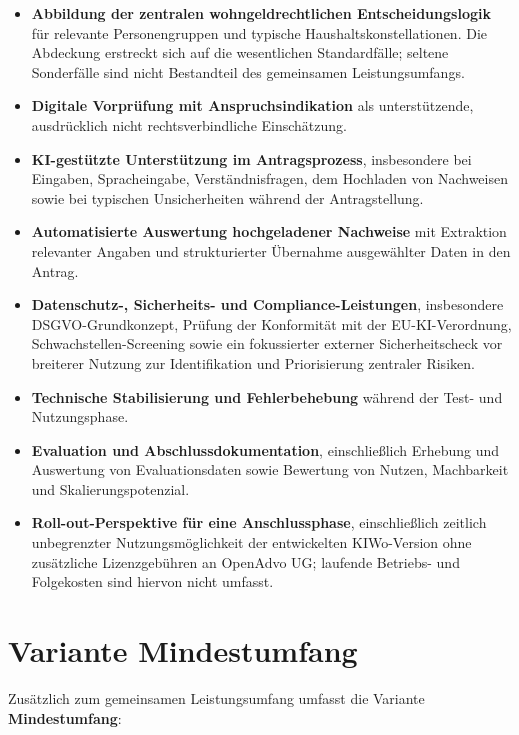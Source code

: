 \documentclass[11pt,a4paper,openany]{report}
\begin{document}
\begin{itemize}
  \item \textbf{Abbildung der zentralen wohngeldrechtlichen Entscheidungslogik} für relevante Personengruppen und typische Haushaltskonstellationen. Die Abdeckung erstreckt sich auf die wesentlichen Standardfälle; seltene Sonderfälle sind nicht Bestandteil des gemeinsamen Leistungsumfangs.
  \item \textbf{Digitale Vorprüfung mit Anspruchsindikation} als unterstützende, ausdrücklich nicht rechtsverbindliche Einschätzung.
  \item \textbf{KI-gestützte Unterstützung im Antragsprozess}, insbesondere bei Eingaben, Spracheingabe, Verständnisfragen, dem Hochladen von Nachweisen sowie bei typischen Unsicherheiten während der Antragstellung.
  \item \textbf{Automatisierte Auswertung hochgeladener Nachweise} mit Extraktion relevanter Angaben und strukturierter Übernahme ausgewählter Daten in den Antrag.
  \item \textbf{Datenschutz-, Sicherheits- und Compliance-Leistungen}, insbesondere DSGVO-Grundkonzept, Prüfung der Konformität mit der EU-KI-Verordnung, Schwachstellen-Screening sowie ein fokussierter externer Sicherheitscheck vor breiterer Nutzung zur Identifikation und Priorisierung zentraler Risiken.
  \item \textbf{Technische Stabilisierung und Fehlerbehebung} während der Test- und Nutzungsphase.
  \item \textbf{Evaluation und Abschlussdokumentation}, einschließlich Erhebung und Auswertung von Evaluationsdaten sowie Bewertung von Nutzen, Machbarkeit und Skalierungspotenzial.
  \item \textbf{Roll-out-Perspektive für eine Anschlussphase}, einschließlich zeitlich unbegrenzter Nutzungsmöglichkeit der entwickelten KIWo-Version ohne zusätzliche Lizenzgebühren an OpenAdvo UG; laufende Betriebs- und Folgekosten sind hiervon nicht umfasst.
\end{itemize}

\section{Variante \textbf{Mindestumfang}}

Zusätzlich zum gemeinsamen Leistungsumfang umfasst die Variante \textbf{Mindestumfang}:
\end{document}
